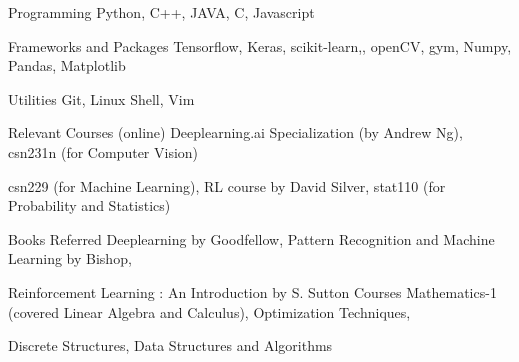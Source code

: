 

\begin{cvskills}

  \cvskill
    {Programming} %
    {Python, C++, JAVA, C, Javascript} %

  \cvskill
    {Frameworks and Packages} %
    {Tensorflow, Keras, scikit-learn,, openCV, gym, Numpy, Pandas, Matplotlib} %
    

  \cvskill
    {Utilities} %
    {Git, Linux Shell, Vim} %


  \cvskill
    {Relevant Courses (online)} %
    {Deeplearning.ai Specialization (by Andrew Ng), csn231n (for Computer Vision)} %
    
    \cvskill
    {}
    {csn229 (for Machine Learning), RL course by David Silver, stat110 (for Probability and Statistics)}
    
    
  \cvskill
    {Books Referred}
    {Deeplearning by Goodfellow, Pattern Recognition and Machine Learning by Bishop,}

    \cvskill
    {}
    {Reinforcement Learning : An Introduction by S. Sutton}
  \cvskill
    {Courses}
    {Mathematics-1 (covered Linear Algebra and Calculus), Optimization Techniques,} 
    
  \cvskill
  {}
  {Discrete Structures, Data Structures and Algorithms}
\end{cvskills}
